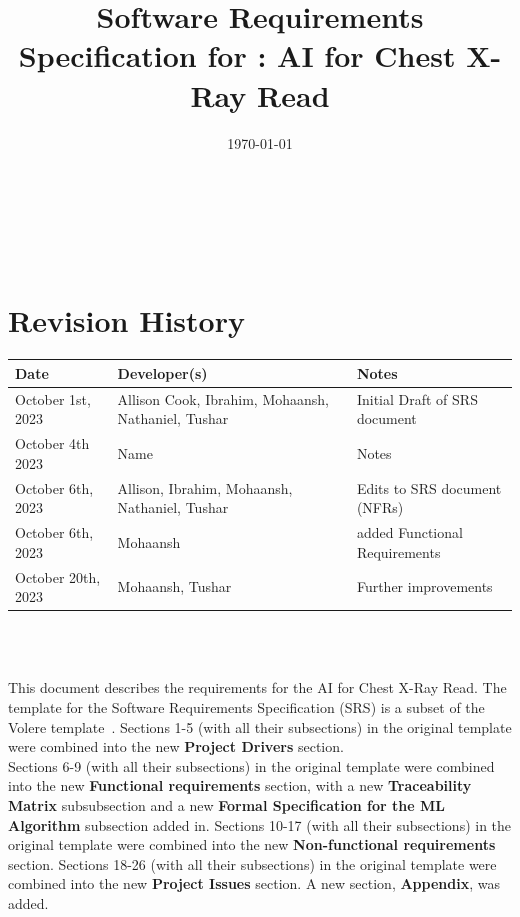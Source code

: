 \documentclass[12pt]{article}
\begin{document}
\title{Software Requirements Specification for \progname: AI for Chest X-Ray Read}
\author{\authname}
\date{\today}
  
\maketitle

~\newpage


\tableofcontents

~\newpage

\section*{Revision History}

\begin{tabularx}{\textwidth}{p{4cm}p{4cm}X}
\toprule {\textbf{Date}} & {\textbf{Developer(s)}} & {\textbf{Notes}}\\
\midrule
October 1st, 2023 & Allison Cook, Ibrahim, Mohaansh, Nathaniel,
Tushar & Initial Draft of SRS document \\
October 4th 2023 & Name & Notes\\
October 6th, 2023 & Allison, Ibrahim, Mohaansh, Nathaniel, Tushar & Edits to SRS document (NFRs) \\
October 6th, 2023 & Mohaansh & added Functional Requirements \\
October 20th, 2023 & Mohaansh, Tushar & Further improvements \\

\bottomrule
\end{tabularx}

~\\

~\newpage


\noindent This document describes the requirements for the AI for Chest X-Ray Read. The template for the
Software Requirements Specification (SRS) is a subset of the Volere
template~\citep{RobertsonAndRobertson2012}.
Sections 1-5 (with all their subsections) in the original template were combined into the new \textbf{Project Drivers} section. \\

\noindent Sections 6-9 (with all their subsections) in the original template were combined into the new \textbf{Functional requirements} section, with a new \textbf{Traceability Matrix} subsubsection and a new \textbf{Formal Specification for the ML Algorithm} subsection added in.
Sections 10-17 (with all their subsections) in the original template were combined into the new \textbf{Non-functional requirements} section. Sections 18-26 (with all their subsections) in the original template were combined into the new \textbf{Project Issues} section. A new section, \textbf{Appendix}, was added.
\end{document}
